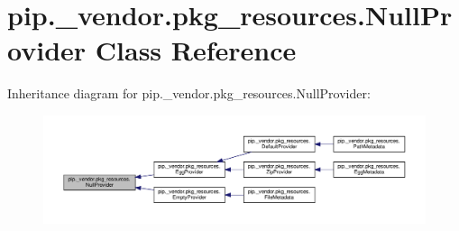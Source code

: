 \hypertarget{classpip_1_1__vendor_1_1pkg__resources_1_1NullProvider}{}\section{pip.\+\_\+vendor.\+pkg\+\_\+resources.\+Null\+Provider Class Reference}
\label{classpip_1_1__vendor_1_1pkg__resources_1_1NullProvider}


Inheritance diagram for pip.\+\_\+vendor.\+pkg\+\_\+resources.\+Null\+Provider\+:
\nopagebreak
\begin{figure}[H]
\begin{center}
\leavevmode
\includegraphics[width=350pt]{classpip_1_1__vendor_1_1pkg__resources_1_1NullProvider__inherit__graph}
\end{center}
\end{figure}
